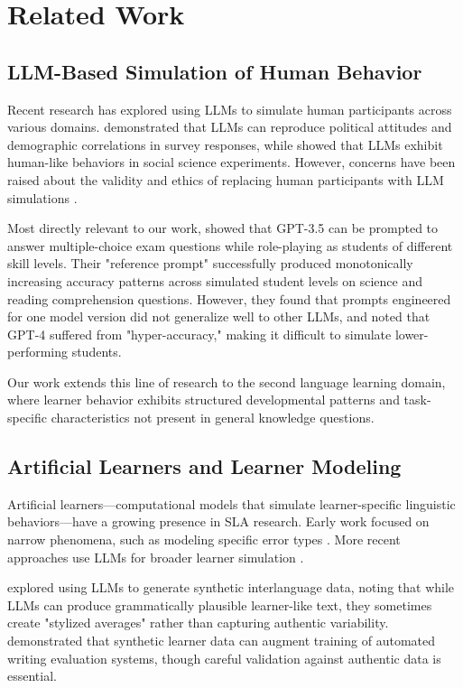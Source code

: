 \section{Related Work}

\subsection{LLM-Based Simulation of Human Behavior}

Recent research has explored using LLMs to simulate human participants across various domains. \citet{argyle2023out} demonstrated that LLMs can reproduce political attitudes and demographic correlations in survey responses, while \citet{aher2023using} showed that LLMs exhibit human-like behaviors in social science experiments. However, concerns have been raised about the validity and ethics of replacing human participants with LLM simulations \cite{crockett2023generative}.

Most directly relevant to our work, \citet{benedetto2024using} showed that GPT-3.5 can be prompted to answer multiple-choice exam questions while role-playing as students of different skill levels. Their "reference prompt" successfully produced monotonically increasing accuracy patterns across simulated student levels on science and reading comprehension questions. However, they found that prompts engineered for one model version did not generalize well to other LLMs, and noted that GPT-4 suffered from "hyper-accuracy," making it difficult to simulate lower-performing students.

Our work extends this line of research to the second language learning domain, where learner behavior exhibits structured developmental patterns and task-specific characteristics not present in general knowledge questions.

\subsection{Artificial Learners and Learner Modeling}

Artificial learners—computational models that simulate learner-specific linguistic behaviors—have a growing presence in SLA research. Early work focused on narrow phenomena, such as modeling specific error types \cite{kim2024let}. More recent approaches use LLMs for broader learner simulation \cite{stearns2024evaluating}.

\citet{xia2024second} explored using LLMs to generate synthetic interlanguage data, noting that while LLMs can produce grammatically plausible learner-like text, they sometimes create "stylized averages" rather than capturing authentic variability. \citet{flor2024ai} demonstrated that synthetic learner data can augment training of automated writing evaluation systems, though careful validation against authentic data is essential.

